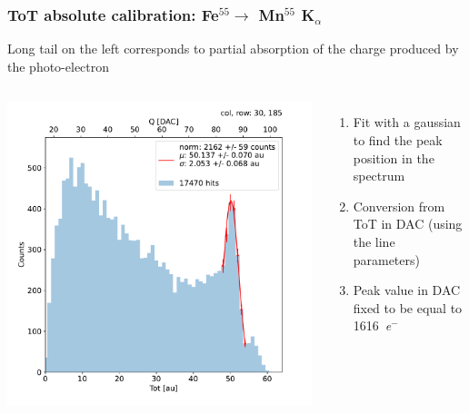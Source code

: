     \begin{frame}
        \frametitle{ToT absolute calibration: Fe$^{55} \rightarrow$ Mn$^{55}$ K$_{\alpha}$}
        Long tail on the left corresponds to partial absorption of the charge produced by the photo-electron
        \begin{columns}
                \includegraphics[width=1.25\linewidth]{figures/charaterization/fit_gauss_r185.pdf}
            \begin{enumerate}
                \item Fit with a gaussian to find the peak position in the spectrum
                \item Conversion from ToT in DAC (using the line parameters)
                \item Peak value in DAC fixed to be equal to \SI{1616}{\elementarycharge}$^-$
            \end{enumerate} 
        \end{columns}
    \end{frame}     


